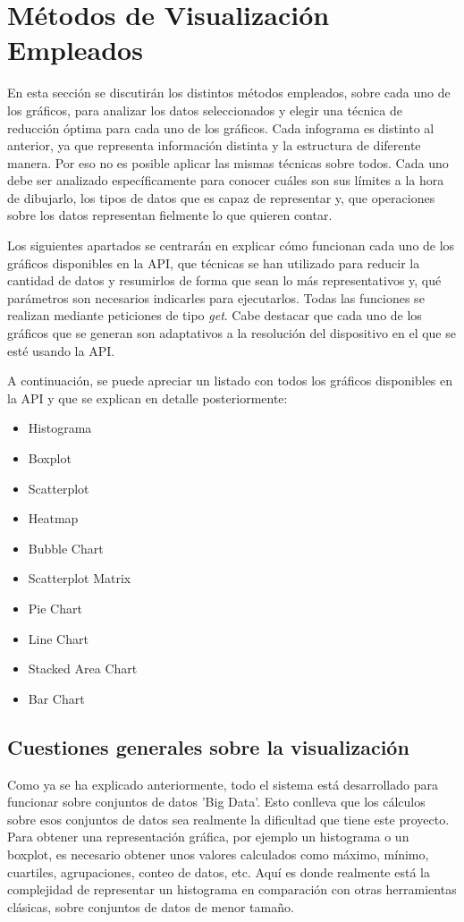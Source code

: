 \chapter{Métodos de Visualización Empleados}

En esta sección se discutirán los distintos métodos empleados, sobre cada uno de los gráficos, para analizar los datos seleccionados y elegir una técnica de reducción óptima para cada uno de los gráficos. Cada infograma es distinto al anterior, ya que representa información distinta y la estructura de diferente manera. Por eso no es posible aplicar las mismas técnicas sobre todos. Cada uno debe ser analizado específicamente para conocer cuáles son sus límites a la hora de dibujarlo, los tipos de datos que es capaz de representar y, que operaciones sobre los datos representan fielmente lo que quieren contar.

Los siguientes apartados se centrarán en explicar cómo funcionan cada uno de los gráficos disponibles en la API, que técnicas se han utilizado para reducir la cantidad de datos y resumirlos de forma que sean lo más representativos y, qué parámetros son necesarios indicarles para ejecutarlos. Todas las funciones se realizan mediante peticiones de tipo \textit{get}. Cabe destacar que cada uno de los gráficos que se generan son adaptativos a la resolución del dispositivo en el que se esté usando la API.

A continuación, se puede apreciar un listado con todos los gráficos disponibles en la API y que se explican en detalle posteriormente:
\begin{itemize}
	\item Histograma
	\item Boxplot
	\item Scatterplot
	\item Heatmap
	\item Bubble Chart
	\item Scatterplot Matrix
	\item Pie Chart
	\item Line Chart
	\item Stacked Area Chart
	\item Bar Chart
\end{itemize}

\section{Cuestiones generales sobre la visualización}
Como ya se ha explicado anteriormente, todo el sistema está desarrollado para funcionar sobre conjuntos de datos 'Big Data'. Esto conlleva que los cálculos sobre esos conjuntos de datos sea realmente la dificultad que tiene este proyecto. Para obtener una representación gráfica, por ejemplo un histograma o un boxplot, es necesario obtener unos valores calculados como máximo, mínimo, cuartiles, agrupaciones, conteo de datos, etc. Aquí es donde realmente está la complejidad de representar un histograma en comparación con otras herramientas clásicas, sobre conjuntos de datos de menor tamaño. 

